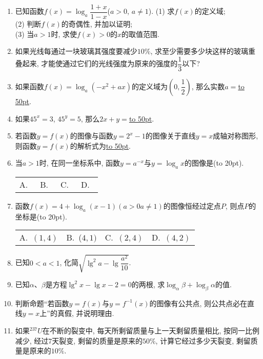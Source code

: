 \documentclass[10pt,a4paper]{article}
\newcommand{\blank}[1]{\underline{\hbox to #1pt{}}}
\newcommand{\bracket}[1]{(\hbox to #1pt{})}
\newcommand{\fourch}[4]{\par\begin{tabular}{p{.23\textwidth}p{.23\textwidth}p{.23\textwidth}p{.23\textwidth}}
A.~#1 &B.~#2& C.~#3& D.~#4
\end{tabular}}
\begin{document}
\begin{enumerate}[1.]
\item 已知函数$f(x)=\log _a\dfrac{1+x}{1-x}$($a>0$, $a\ne 1$).
(1) 求$f(x)$的定义域;\\
(2) 判断$f(x)$的奇偶性, 并加以证明;\\
(3) 当$a>1$时, 求使$f(x)>0$的$x$的取值范围.
\item 如果光线每通过一块玻璃其强度要减少$10\%$, 求至少需要多少块这样的玻璃重叠起来, 才能使通过它们的光线强度为原来的强度的$\dfrac 13$以下?
\item 如果函数$f(x)=\log _a(-x^2+ax)$的定义域为$(0,\dfrac 12)$, 那么实数$a=$\blank{50}.
\item 如果$45^x=3$, $45^y=5$, 那么$2x+y=$\blank{50}.
\item 若函数$y=f(x)$的图像与函数$y=2^x-1$的图像关于直线$y=x$成轴对称图形, 则函数$y=f(x)$的解析式为\blank{50}.
\item 当$a>1$时, 在同一坐标系中, 函数$y=a^{-x}$与$y=\log _ax$的图像是\bracket{20}.
\fourch{\begin{tikzpicture}[scale = 0.7, >=latex]
    \draw [->] (-2,0) -- (2,0) node [below] {$x$};
    \draw [->] (0,-2) -- (0,2) node [left] {$y$};
    \draw (0,0) node [below left] {$O$};
    \draw [domain = -1:2] plot (\x, {pow(0.5,\x)});
    \draw [domain = -1:2] plot ({pow(0.5,\x)},-\x);
\end{tikzpicture}}
{\begin{tikzpicture}[scale = 0.7, >=latex]
    \draw [->] (-2,0) -- (2,0) node [below] {$x$};
    \draw [->] (0,-2) -- (0,2) node [left] {$y$};
    \draw (0,0) node [below left] {$O$};
    \draw [domain = -1:2] plot (-\x, {pow(0.5,\x)});
    \draw [domain = -1:2] plot ({pow(0.5,\x)},-\x);
\end{tikzpicture}}{\begin{tikzpicture}[scale = 0.7, >=latex]
    \draw [->] (-2,0) -- (2,0) node [below] {$x$};
    \draw [->] (0,-2) -- (0,2) node [left] {$y$};
    \draw (0,0) node [below left] {$O$};
    \draw [domain = -1:2] plot (-\x, {pow(0.5,\x)});
    \draw [domain = -1:2] plot ({pow(0.5,\x)},\x);
\end{tikzpicture}}{\begin{tikzpicture}[scale = 0.7, >=latex]
    \draw [->] (-2,0) -- (2,0) node [below] {$x$};
    \draw [->] (0,-2) -- (0,2) node [left] {$y$};
    \draw (0,0) node [below left] {$O$};
    \draw [domain = -1:2] plot (\x, {pow(0.5,\x)});
    \draw [domain = -1:2] plot ({pow(0.5,\x)},\x);
\end{tikzpicture}}
\item 函数$f(x)=4+\log _a(x-1)(a>0a\ne 1)$的图像恒经过定点$P$, 则点$P$的坐标是\bracket{20}.
\fourch{$(1, 4)$}{($4, 1)$}{$(2, 4)$}{$(4, 2)$}
\item 已知$0<a<1$, 化简$\sqrt {\lg ^2a-\lg \dfrac{a^2}{10}}$.
\item 已知$\alpha$、$\beta$是方程$\lg ^2x-\lg x-2=0$的两根, 求$\log _{\alpha }\beta +\log _{\beta }\alpha$的值.
\item 判断命题``若函数$y=f(x)$与$y=f^{-1}(x)$的图像有公共点, 则公共点必在直线$y=x$上''的真假, 并说明理由.
\item 如果$^{237}U$在不断的裂变中, 每天所剩留质量与上一天剩留质量相比, 按同一比例减少, 经过$7$天裂变, 剩留的质量是原来的$50\%$, 计算它经过多少天裂变, 剩留质量是原来的$10\%$.


\end{enumerate}
\end{document}
